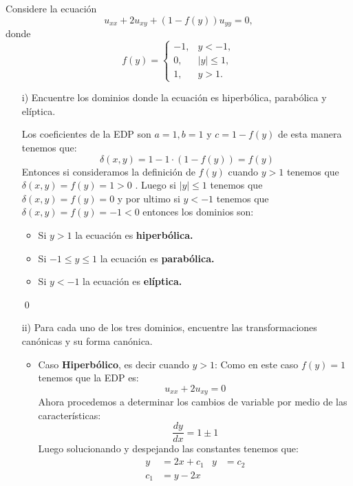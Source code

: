 \begin{homeworkProblem}
    Considere la ecuación
    $$u_{xx}+2u_{xy}+(1-f(y))u_{yy}=0,$$
    donde
    $$f(y)=\begin{cases}
        -1, &y<-1,\\
        0, &|y|\leq1,\\
        1, &y>1.
    \end{cases}$$
    \begin{itemize}
        \item [i)] Encuentre los dominios donde la ecuación es hiperbólica, parabólica y elíptica.
        \begin{solucion}
         Los coeficientes de la EDP son $a=1, b=1$ y $c=1-f(y)$ de esta manera tenemos que:
         $$\delta(x,y)=1-1\cdot(1-f(y))=f(y)$$
         Entonces si consideramos la definición de $f(y)$ cuando $y>1$ tenemos que \\$\delta(x,y)=f(y)=1>0$ . Luego si $|y|\leq 1$ tenemos que $\delta(x,y)=f(y)=0$ y por ultimo si $y<-1$ tenemos que $\delta(x,y)=f(y)=-1<0$ entonces los dominios son:
         \begin{itemize}
             \item Si $y>1$ la ecuación es \textbf{hiperbólica.}
              \item Si $-1\leq y\leq 1$ la ecuación es \textbf{parabólica.}
               \item Si $y<-1$ la ecuación es \textbf{elíptica.}
         \end{itemize}
         \qed
        \end{solucion}
        \item [ii)] Para cada uno de los tres dominios, encuentre las transformaciones canónicas y su forma canónica.
        \begin{solucion}
            \begin{itemize}
                \item Caso \textbf{Hiperbólico}, es decir cuando $y>1$:
                Como en este caso $f(y)=1$ tenemos que la EDP es:
                $$u_{xx}+2u_{xy}=0$$
                Ahora procedemos a determinar los cambios de variable por medio de las características:
                $$\dfrac{dy}{dx}=1\pm1$$
                Luego solucionando y despejando las constantes tenemos que:
                \begin{align*}
                    y&=2x+c_1 & y&=c_2\\
                    c_1&=y-2x
                \end{align*}

\end{itemize}
\end{solucion}
\end{itemize}
\end{homeworkProblem}
